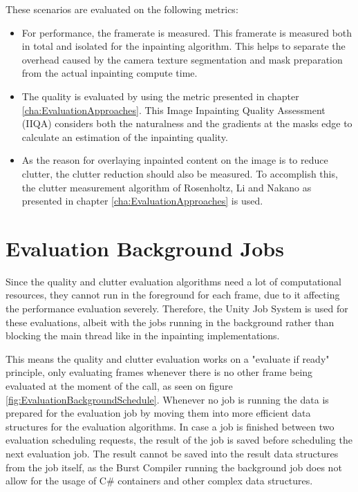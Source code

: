 These scenarios are evaluated on the following metrics:

\begin{itemize}
  \item For performance, the framerate is measured. This framerate is measured both in total and isolated for the inpainting algorithm. This helps to separate the overhead caused by the camera texture segmentation and mask preparation from the actual inpainting compute time.

  \item The quality is evaluated by using the metric presented in chapter \ref{cha:EvaluationApproaches}. This Image Inpainting Quality Assessment (IIQA) considers both the naturalness and the gradients at the masks edge to calculate an estimation of the inpainting quality.

  \item As the reason for overlaying inpainted content on the image is to reduce clutter, the clutter reduction should also be measured. To accomplish this, the clutter measurement algorithm of Rosenholtz, Li and Nakano as presented in chapter \ref{cha:EvaluationApproaches} is used.
\end{itemize}

\section{Evaluation Background Jobs}

Since the quality and clutter evaluation algorithms need a lot of computational resources, they cannot run in the foreground for each frame, due to it affecting the performance evaluation severely. Therefore, the Unity Job System is used for these evaluations, albeit with the jobs running in the background rather than blocking the main thread like in the inpainting implementations.

This means the quality and clutter evaluation works on a "evaluate if ready" principle, only evaluating frames whenever there is no other frame being evaluated at the moment of the call, as seen on figure \ref{fig:EvaluationBackgroundSchedule}. Whenever no job is running the data is prepared for the evaluation job by moving them into more efficient data structures for the evaluation algorithms. 
In case a job is finished between two evaluation scheduling requests, the result of the job is saved before scheduling the next evaluation job. The result cannot be saved into the result data structures from the job itself, as the Burst Compiler running the background job does not allow for the usage of C\string# containers and other complex data structures.

